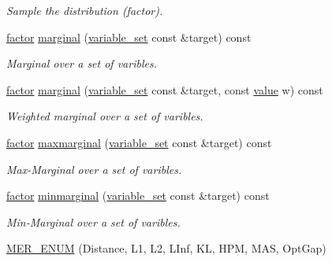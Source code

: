 \begin{DoxyCompactItemize}
\begin{DoxyCompactList}\small\item\em Sample the distribution (factor). \end{DoxyCompactList}\item 
\hyperlink{classmerlin_1_1factor}{factor} \hyperlink{classmerlin_1_1factor_ac857d47b1c1574a65baf5f19572db17b}{marginal} (\hyperlink{classmerlin_1_1variable__set}{variable\+\_\+set} const \&target) const 
\begin{DoxyCompactList}\small\item\em Marginal over a set of varibles. \end{DoxyCompactList}\item 
\hyperlink{classmerlin_1_1factor}{factor} \hyperlink{classmerlin_1_1factor_ab2f2a0ce290bcb53368c29707629f8b5}{marginal} (\hyperlink{classmerlin_1_1variable__set}{variable\+\_\+set} const \&target, const \hyperlink{classmerlin_1_1factor_a1b14d19e509403448fbef26b003c9281}{value} w) const 
\begin{DoxyCompactList}\small\item\em Weighted marginal over a set of varibles. \end{DoxyCompactList}\item 
\hyperlink{classmerlin_1_1factor}{factor} \hyperlink{classmerlin_1_1factor_a9e99845815dc5f2ddf48a4e23db67b66}{maxmarginal} (\hyperlink{classmerlin_1_1variable__set}{variable\+\_\+set} const \&target) const 
\begin{DoxyCompactList}\small\item\em Max-\/\+Marginal over a set of varibles. \end{DoxyCompactList}\item 
\hyperlink{classmerlin_1_1factor}{factor} \hyperlink{classmerlin_1_1factor_a6e34c8aac434508af856f23f8abece83}{minmarginal} (\hyperlink{classmerlin_1_1variable__set}{variable\+\_\+set} const \&target) const 
\begin{DoxyCompactList}\small\item\em Min-\/\+Marginal over a set of varibles. \end{DoxyCompactList}\item 
\hypertarget{classmerlin_1_1factor_a0b3fa98e1358652570e3926eca0d14d3}{}\hyperlink{classmerlin_1_1factor_a0b3fa98e1358652570e3926eca0d14d3}{M\+E\+R\+\_\+\+E\+N\+U\+M} (Distance, L1, L2, L\+Inf, K\+L, H\+P\+M, M\+A\+S, Opt\+Gap)\label{classmerlin_1_1factor_a0b3fa98e1358652570e3926eca0d14d3}


\end{DoxyCompactItemize}
